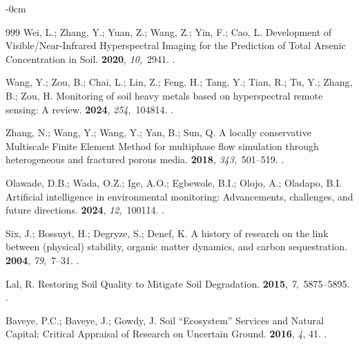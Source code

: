 \documentclass[environremediat,article,accept,pdftex,oneauthor]{Definitions/mdpi}
\begin{document}
\begin{adjustwidth}{-\extralength}{0cm}
\begin{thebibliography}{999}
Wei, L.; Zhang, Y.; Yuan, Z.; Wang, Z.; Yin, F.; Cao, L.
\newblock Development of Visible/Near-Infrared Hyperspectral Imaging for the
  Prediction of Total Arsenic Concentration in Soil.
 {\bf 2020}, {\em 10},~2941.
.

Wang, Y.; Zou, B.; Chai, L.; Lin, Z.; Feng, H.; Tang, Y.; Tian, R.; Tu, Y.;
  Zhang, B.; Zou, H.
\newblock Monitoring of soil heavy metals based on hyperspectral remote
  sensing: A review.
 {\bf 2024}, {\em 254},~104814.
.

Zhang, N.; Wang, Y.; Wang, Y.; Yan, B.; Sun, Q.
\newblock A locally conservative Multiscale Finite Element Method for
  multiphase flow simulation through heterogeneous and fractured porous media.
 {\bf 2018},
  {\em 343},~501--519.
.

Olawade, D.B.; Wada, O.Z.; Ige, A.O.; Egbewole, B.I.; Olojo, A.; Oladapo, B.I.
\newblock Artificial intelligence in environmental monitoring: Advancements,
  challenges, and future directions.
 {\bf 2024}, {\em
  12},~100114.
.

Six, J.; Bossuyt, H.; Degryze, S.; Denef, K.
\newblock A history of research on the link between (physical) stability,
  organic matter dynamics, and carbon sequestration.
 {\bf 2004}, {\em 79},~7--31.
.

Lal, R.
\newblock Restoring Soil Quality to Mitigate Soil Degradation.
 {\bf 2015}, {\em 7},~5875--5895.
.

Baveye, P.C.; Baveye, J.; Gowdy, J.
\newblock Soil “Ecosystem” Services and Natural Capital: Critical Appraisal
  of Research on Uncertain Ground.
 {\bf 2016}, {\em 4}, 41.
.


\end{thebibliography}
\end{adjustwidth}
\end{document}

